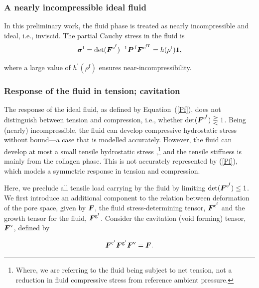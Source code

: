 \subsubsection{A nearly incompressible ideal fluid}
\label{ideal-incompressible-fluid}

In this preliminary work, the fluid phase is treated as nearly
incompressible and ideal, i.e., inviscid. The partial Cauchy
stress in the fluid is
\begin{equation}
\mbox{\boldmath$\sigma$}^\mathrm{f} =
\mathrm{det}(\mbox{\boldmath$ F$}^{\mathrm{e}^\mathrm{f}})^{-1}
\mbox{\boldmath$ P$}^{\,\mathrm{f}}\mbox{\boldmath$ F$}^{\mathrm{e}^\mathrm{fT}} 
= h(\rho^\mathrm{f}){\bf 1},\label{Pf}
\end{equation}

\noindent where a large value of $h^\prime(\rho^\mathrm{f})$ ensures
near-in\-comp\-ress\-i\-bil\-i\-ty. 

\subsubsection{Response of the fluid in tension; cavitation}
\label{caviation-under-tension}

The response of the ideal fluid, as defined by \mbox{Equation
  (\ref{Pf})}, does not distinguish between tension and compression,
  i.e., whether 
$\mathrm{det}(\mbox{\boldmath$ F$}^{\mathrm{e}^\mathrm{f}}) \gtreqless 1$. Being
(nearly) incompressible, the fluid can develop compressive hydrostatic
  stress
without bound---a case that is modelled accurately. However, the fluid
can develop at most a small tensile hydrostatic stress
\citep{cavitationchris},\footnote{Where, we are referring to the fluid
  being subject to net tension, not a reduction in fluid compressive
  stress from reference ambient pressure.} and the tensile
stiffness is mainly from the collagen phase. This is not accurately
represented by (\ref{Pf}), which models a symmetric response in
tension and compression.

Here, we preclude all tensile load carrying by the fluid by limiting
$\mathrm{det}(\mbox{\boldmath$ F$}^{\mathrm{e}^\mathrm{f}}) \leq 1$. We first introduce
an additional component to the relation between 
deformation of the pore space, given by $\mbox{\boldmath$ F$}$, the fluid
stress-determining tensor, 
$\mbox{\boldmath$ F$}^{\mathrm{e}^\mathrm{f}}$ and the growth tensor for the fluid,
$\mbox{\boldmath$ F$}^{\mathrm{g}^\mathrm{f}}$. Consider the cavitation (void forming) tensor,
$\mbox{\boldmath$ F$}^{\mathrm{v}}$, defined by
  
\begin{equation}
 \mbox{\boldmath$ F$}^{\mathrm{e}^\mathrm{f}}\mbox{\boldmath$ F$}^{\mathrm{g}^\mathrm{f}}
 \mbox{\boldmath$ F$}^{\mathrm{v}} = \mbox{\boldmath$ F$}.
\label{fvoid}
\end{equation}


